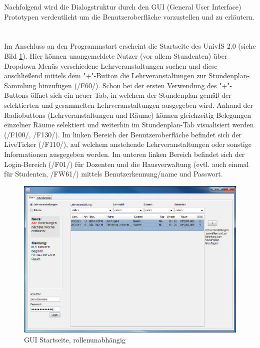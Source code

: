 Nachfolgend wird die Dialogstruktur durch den GUI (General User Interface) Prototypen verdeutlicht um die Benutzeroberfläche vorzustellen und zu erläutern.\\ \\ \\
Im Anschluss an den Programmstart erscheint die Startseite des UnivIS 2.0 (siehe Bild \ref{img:hauptseite}). Hier können unangemeldete Nutzer (vor allem Stundenten) über Dropdown Menüs verschiedene Lehrveranstaltungen suchen und diese anschließend mittels dem "+"-Button die Lehrveranstaltungen zur Stundenplan-Sammlung hinzufügen (/F60/). Schon bei der ersten Verwendung des "+"-Buttons öffnet sich ein neuer Tab, in welchem der Stundenplan gemäß der selektierten und gesammelten Lehrveranstaltungen ausgegeben wird. Anhand der Radiobuttons (Lehrveranstaltungen und Räume) können gleichzeitig Belegungen einzelner Räume selektiert und weiterhin im Stundenplan-Tab visualisiert werden (/F100/, /F130/).
Im linken Bereich der Benutzeroberfläche befindet sich der LiveTicker (/F110/), auf welchem anstehende Lehrveranstaltungen oder sonstige Informationen ausgegeben werden.
Im unteren linken Bereich befindet sich der Login-Bereich (/F01/) für Dozenten und die Hausverwaltung (evtl. auch einmal für Studenten, /FW61/) mittels Benutzerkennung/name und Passwort.
\begin{figure}[H]
\begin{center}
\includegraphics[width=150mm]{images/section_7/HauptseiteAlle.PNG}
\caption{GUI Startseite, rollenunabhängig}
\label{img:hauptseite}
\end{center}
\end{figure}

